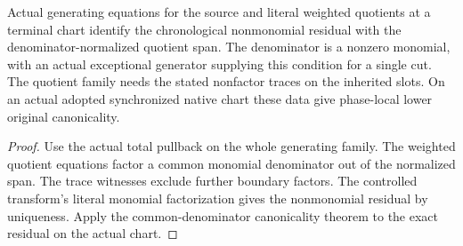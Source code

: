 \begin{theorem}
\label{hir:g8-actual-quotient-residual-restart}
\leanok
Actual generating equations for the source and literal weighted
quotients at a terminal chart identify the chronological nonmonomial
residual with the denominator-normalized quotient span. The
denominator is a nonzero monomial, with an actual exceptional
generator supplying this condition for a single cut. The quotient
family needs the stated nonfactor traces on the inherited slots.
On an actual adopted synchronized native chart these data give
phase-local lower original canonicality.
\end{theorem}
\begin{proof}
Use the actual total pullback on the whole generating family.
The weighted quotient equations factor a common monomial
denominator out of the normalized span. The trace witnesses
exclude further boundary factors. The controlled transform's
literal monomial factorization gives the nonmonomial residual by
uniqueness. Apply the common-denominator canonicality theorem to
the exact residual on the actual chart.
\end{proof}

